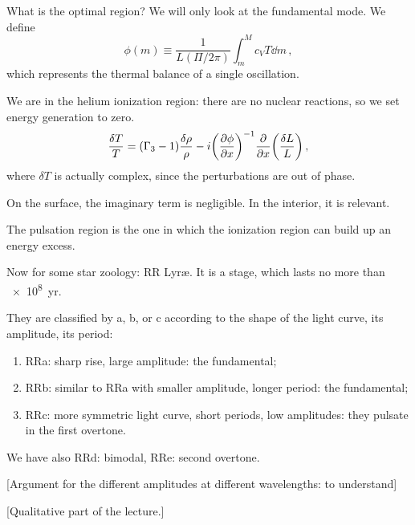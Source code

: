 \documentclass[main.tex]{subfiles}
\begin{document}
What is the optimal region? We will only look  at the fundamental mode. We define
%
\begin{equation}
  \phi (m) \equiv \frac{1}{L(\Pi / 2 \pi )}\int_m^M c_V T \dd{m} 
\,,
\end{equation}
%
which represents the thermal balance of a single oscillation.

We are in the helium ionization region: there are no nuclear reactions, so we set energy generation to zero. 
%
\begin{equation}
  \frac{\delta T}{T} = (\Gamma_3 -1 ) \frac{\delta \rho }{\rho } - i \qty(\pdv{\phi }{x} )^{-1} \pdv{}{x} \qty(\frac{\delta L}{L})
\,,
\end{equation}
%
where \(\delta T\) is actually complex, since the perturbations are out of phase.

On the surface, the imaginary term is negligible. In the interior, it is relevant.

The pulsation region is the one in which the ionization region can build up an energy excess. 

Now for some star zoology: RR Lyr\ae.
It is a stage, which lasts no more than \SI{e8}{yr}.

They are classified by a, b, or c according to the shape of the light curve, its amplitude, its period:

\begin{enumerate}
  \item RRa: sharp rise, large amplitude: the fundamental;
  \item RRb: similar to RRa with smaller amplitude, longer period: the fundamental;
  \item RRc: more symmetric light curve, short periods, low amplitudes: they pulsate in the first overtone.
\end{enumerate}

We have also RRd: bimodal, RRe: second overtone.

[Argument for the different amplitudes at different wavelengths: to understand]

[Qualitative part of the lecture.]
\end{document}
